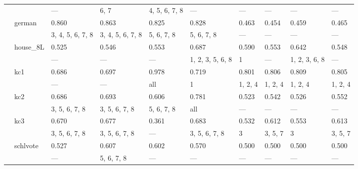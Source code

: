 \documentclass{article}
\begin{document}
\begin{center}
\begin{longtable}{p{1.2cm}p{1.8cm}p{1cm}p{1cm}p{1cm}p{1cm}p{1cm}p{1cm}p{1cm}p{1cm}}
             &              & ---              & 6, 7             & 4, 5, 6, 7, 8    & ---              & ---        & ---           & ---           & ---           \\
             & german       & 0.860            & 0.863            & 0.825            & 0.828            & 0.463      & 0.454         & 0.459         & 0.465         \\
             &              & 3, 4, 5, 6, 7, 8 & 3, 4, 5, 6, 7, 8 & 5, 6, 7, 8       & 5, 6, 7, 8       & ---        & ---           & ---           & ---           \\
             & house\_8L     & 0.525            & 0.546            & 0.553            & 0.687            & 0.590      & 0.553         & 0.642         & 0.548         \\
             &              & ---              & ---              & ---              & 1, 2, 3, 5, 6, 8 & 1          & ---           & 1, 2, 3, 6, 8 & ---           \\
             & kc1          & 0.686            & 0.697            & 0.978            & 0.719            & 0.801      & 0.806         & 0.809         & 0.805         \\
             &              & ---              & ---              & all              & 1                & 1, 2, 4    & 1, 2, 4       & 1, 2, 4       & 1, 2, 4       \\
             & kc2          & 0.686            & 0.693            & 0.606            & 0.781            & 0.523      & 0.542         & 0.526         & 0.552         \\
             &              & 3, 5, 6, 7, 8    & 3, 5, 6, 7, 8    & 5, 6, 7, 8       & all              & ---        & ---           & ---           & ---           \\
             & kc3          & 0.670            & 0.677            & 0.361            & 0.683            & 0.532      & 0.612         & 0.553         & 0.613         \\
             &              & 3, 5, 6, 7, 8    & 3, 5, 6, 7, 8    & ---              & 3, 5, 6, 7, 8    & 3          & 3, 5, 7       & 3             & 3, 5, 7       \\
             & schlvote     & 0.527            & 0.607            & 0.602            & 0.570            & 0.500      & 0.500         & 0.500         & 0.500         \\
             &              & ---              & 5, 6, 7, 8       & ---              & ---              & ---        & ---           & ---           & ---           \\

\end{longtable}
\end{center}
\end{document}
